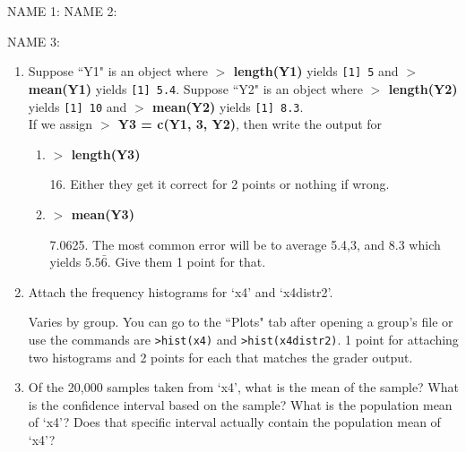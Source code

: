 \documentclass{article}
\newcommand{\Rin}[1]{\textbf{$>$ {#1}}}
\newcommand{\Rout}[1]{\texttt{{#1}}}
\newcommand{\answer}[1]{\color{red}#1}
\begin{document}
\pagestyle{myheadings}

\begin{center}
\textbf{}
\end{center}

NAME 1:{\underbar{\hspace{2in}}} \hfill NAME 2:{\underbar{\hspace{2in}} 

\bigskip

NAME 3:{\underbar{\hspace{2in}}

\begin{enumerate}

\item Suppose ``Y1" is an object where \Rin{length(Y1)} yields \Rout{[1] 5} and \Rin{mean(Y1)} yields \Rout{[1] 5.4}. Suppose ``Y2" is an object where \Rin{length(Y2)} yields \Rout{[1] 10} and \Rin{mean(Y2)} yields \Rout{[1] 8.3}. \\
If we assign \Rin{Y3 = c(Y1, 3, Y2)}, then write the output for
	\begin{enumerate}
	\item \Rin{length(Y3)}
	
	{\answer 16. Either they get it correct for 2 points or nothing if wrong.}
	
	\item \Rin{mean(Y3)}
	
	{\answer 7.0625. The most common error will be to average 5.4,3, and 8.3 which yields $5.5\bar{6}$. Give them 1 point for that.}
	
	\end{enumerate}
	
	\vfill
	
\item Attach the frequency histograms for `x4' and `x4distr2'.

    {\answer Varies by group. You can go to the ``Plots" tab after opening a group's file or use the commands are \texttt{>hist(x4)} and \texttt{>hist(x4distr2)}. 1 point for attaching two histograms and 2 points for each that matches the grader output.}

    \vfill


\item Of the 20,000 samples taken from `x4', what is the mean of the  sample? What is the confidence interval based on the  sample? What is the population mean of `x4'? Does that specific interval actually contain the population mean of `x4'?


\end{enumerate}}}
\end{document}
